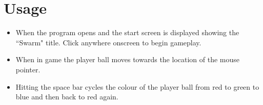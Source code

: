 \section{Usage}

\begin{itemize}
	\item When the program opens and the start screen is displayed showing the ``Swarm" title. Click anywhere onscreen to begin gameplay.
	\item When in game the player ball moves towards the location of the mouse pointer.
	\item Hitting the space bar cycles the colour of the player ball from red to green to blue and then back to red again.
\end{itemize}